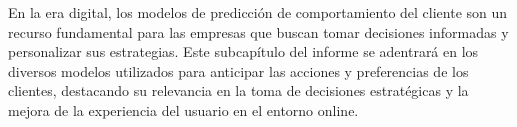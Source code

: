 En la era digital, los modelos de predicción de comportamiento del cliente son un recurso fundamental para las empresas que buscan tomar decisiones informadas y personalizar sus estrategias. Este subcapítulo del informe se adentrará en los diversos modelos utilizados para anticipar las acciones y preferencias de los clientes, destacando su relevancia en la toma de decisiones estratégicas y la mejora de la experiencia del usuario en el entorno online.

